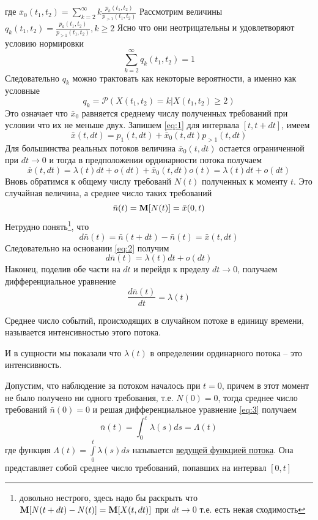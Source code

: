 где $\bar{x}_0 (t_1, t_2) = \sum_{k=2}^{\infty}{k \frac{p_k (t_1, t_2)}{p_{>1} (t_1, t_2)}}$
Рассмотрим величины $q_k (t_1, t_2) = \frac{p_k (t_1, t_2)}{p_{>1} (t_1, t_2)}, k \geq 2$
Ясно что они неотрицательны и удовлетворяют условию нормировки
$$\sum_{k=2}^{\infty}{q_k (t_1, t_2)} = 1$$
Следовательно $q_k$ можно трактовать как некоторые вероятности, а именно как условные
$$q_k = \mathcal{P}\left(X(t_1, t_2) = k | X(t_1, t_2) \geq 2\right)$$
Это означает что $\bar{x}_0$ равняется среднему числу полученных требований при условии что их не меньше двух. Запишем \eqref{eq:1} для интервала $[t, t + dt]$, имеем 
$$\bar{x}(t, dt) = p_1 (t, dt) + \bar{x}_0 (t, dt)p_{>1}(t, dt)$$
Для большинства реальных потоков величина $\bar{x}_0 (t, dt)$ остается ограниченной при $dt \to 0$ и тогда в предположении ординарности потока получаем
\begin{equation}\label{eq:2}
	\bar{x}(t, dt) = \lambda(t)dt + o(dt) + \bar{x}_0 (t, dt) o(t) = \lambda(t)dt + o(dt)
\end{equation}
Вновь обратимся к общему числу требованй $N(t)$ полученных к моменту $t$. Это случайная величина, а среднее число таких требований
$$\bar{n}(t) = \mathbf{M}[N(t)] = \bar{x}(0, t)$$
Нетрудно понять\footnote{довольно нестрого, здесь надо бы раскрыть что $\mathbf{M}[N(t + dt) - N(t)] = \mathbf{M}[X(t, dt)]$ при $dt \to 0$ т.е. есть некая сходимость}, что 
$$d\bar{n}(t) = \bar{n}(t + dt) - \bar{n}(t) = \bar{x}(t, dt)$$
Следовательно на основании \eqref{eq:2} получим
$$d\bar{n}(t) = \lambda(t)dt + o(dt)$$
Наконец, поделив обе части на $dt$ и перейдя к пределу $dt \to 0$, получаем дифференциальное уравнение
\begin{equation}
	\frac{d\bar{n}(t)}{dt} = \lambda(t)
\end{equation}
\begin{definition}\label{eq:3}
	Среднее число событий, происходящих в случайном потоке в единицу времени, называется {\color{red}интенсивностью} этого потока.
\end{definition}
И в сущности мы показали что $\lambda(t)$ в определении ординарного потока -- это интенсивность.

Допустим, что наблюдение за потоком началось при $t = 0$, причем в этот момент не было получено ни одного требования, т.е. $N(0) = 0$, тогда среднее число требований
$\bar{n}(0) = 0$ и решая дифференциальное уравнение \eqref{eq:3} получаем
$$\bar{n}(t) = \int_{0}^{t}{\lambda(s)ds} = \Lambda(t)$$
где функция $\Lambda(t) = \int\limits_{0}^{t}{\lambda(s)ds}$ называется \underline{ведущей функцией потока}. Она представляет собой среднее число требований, попавших на интервал $[0, t]$

